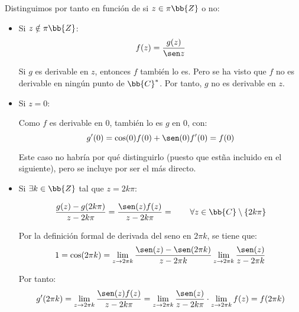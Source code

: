 \documentclass[12pt]{article}
\begin{document}
\begin{ejercicio}[3 puntos]
        Distinguimos por tanto en función de si $z\in \pi\bb{Z}$ o no:
        \begin{itemize}

            \item Si $z\notin \pi\bb{Z}$:
            \begin{equation*}
                f(z)=\dfrac{g(z)}{\sen z}
            \end{equation*}

            Si $g$ es derivable en $z$, entonces $f$ también lo es. Pero se ha visto que $f$ no es derivable en ningún punto de $\bb{C}^*$. Por tanto, $g$ no es derivable en $z$.

            \item Si $z=0$:
            
            Como $f$ es derivable en $0$, también lo es $g$ en $0$, con:
            \begin{equation*}
                g'(0) = \cos(0)f(0) + \sen(0)f'(0) = f(0)
            \end{equation*}
            \begin{observacion}
            Este caso no habría por qué distinguirlo (puesto que estña incluido en el siguiente), pero se incluye por ser el más directo.
            \end{observacion}

            \item Si $\exists k\in \bb{Z}$ tal que $z=2k\pi$:
            
            \begin{equation*}
                \dfrac{g(z)-g(2k\pi)}{z-2k\pi} = \dfrac{\sen(z)f(z)}{z-2k\pi}= \qquad \forall z\in \bb{C}\setminus \{2k\pi\}
            \end{equation*}

            Por la definición formal de derivada del seno en $2\pi k$, se tiene que:
            \begin{equation*}
                1 = \cos(2\pi k) = \lim_{z\to 2\pi k}\dfrac{\sen(z)-\sen(2\pi k)}{z-2\pi k}
                \lim_{z\to 2\pi k}\dfrac{\sen(z)}{z-2\pi k}
            \end{equation*}

            Por tanto:
            \begin{equation*}
                g'(2\pi k) = \lim_{z\to 2\pi k}\dfrac{\sen(z)f(z)}{z-2k\pi}
                = \lim_{z\to 2\pi k}\dfrac{\sen(z)}{z-2k\pi}\cdot \lim_{z\to 2\pi k} f(z)
                = f(2\pi k)
            \end{equation*}


\end{itemize}
\end{ejercicio}
\end{document}
